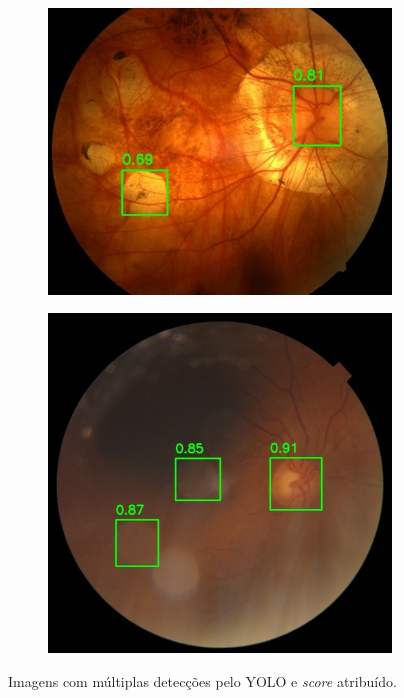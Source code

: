 \documentclass[12pt]{article}
\begin{document}
\begin{figure}
\begin{subfigure}[b]{0.47\textwidth}
        \label{fig:multiple_boxes_2}
    \end{subfigure}
    \break
    \begin{subfigure}[b]{0.47\textwidth}
        \centering
        \includegraphics[width=\textwidth]{images/multiple_boxes/TRAIN011494_boxes.jpg}
        \label{fig:multiple_boxes_3}
    \end{subfigure}
    \hfill
    \begin{subfigure}[b]{0.47\textwidth}
        \centering
        \includegraphics[width=\textwidth]{images/multiple_boxes/TRAIN031299_boxes.jpg}
        \label{fig:multiple_boxes_4}
    \end{subfigure}
    \caption{Imagens com múltiplas detecções pelo YOLO e \emph{score} atribuído.}
    \label{fig:multiple_boxes}
\end{figure}
\end{document}
